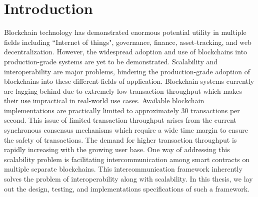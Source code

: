 \documentclass[a4paper,twoside,phd]{BYUPhys}
\begin{document}
 \frontmatter


 \makepreliminarypages


\doublespace
%

%

 \clearemptydoublepage
\singlespace
 \tableofcontents

\clearemptydoublepage
\listoffigures

\clearemptydoublepage
\listoftables

\clearemptydoublepage

\mainmatter
%
\chapter{Introduction}
\label{chap:Introduction}
Blockchain technology has demonstrated enormous potential utility in multiple fields including ``Internet of things", governance, finance, asset-tracking, and web decentralization. However, the widespread adoption and use of blockchains into production-grade systems are yet to be demonstrated. 
 Scalability and interoperability are major problems, hindering the production-grade adoption of blockchains into these different fields of application. Blockchain systems currently are lagging behind due to extremely low transaction throughput which makes their use impractical in real-world use cases. Available blockchain implementations are practically limited to approximately 30 transactions per second. This issue of limited transaction throughput arises from the current synchronous consensus mechanisms which require a wide time margin to ensure the safety of transactions. The demand for higher transaction throughput is rapidly increasing with the growing user base. One way of addressing this scalability problem is facilitating intercommunication among smart contracts on multiple separate blockchains. This intercommunication framework inherently solves the problem of interoperability along with scalability. In this thesis, we lay out the design, testing, and implementations specifications of such a framework.
 
\end{document}
